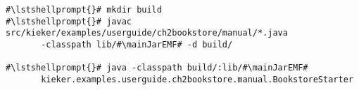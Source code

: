 \begin{lstlisting}[caption=Commands to compile and run the instrumented Bookstore under \UnixLikeSystems{},label=lst:bookstoreStarterLinux]
#\lstshellprompt{}# mkdir build
#\lstshellprompt{}# javac src/kieker/examples/userguide/ch2bookstore/manual/*.java 
       -classpath lib/#\mainJarEMF# -d build/

#\lstshellprompt{}# java -classpath build/:lib/#\mainJarEMF#
       kieker.examples.userguide.ch2bookstore.manual.BookstoreStarter
\end{lstlisting} 